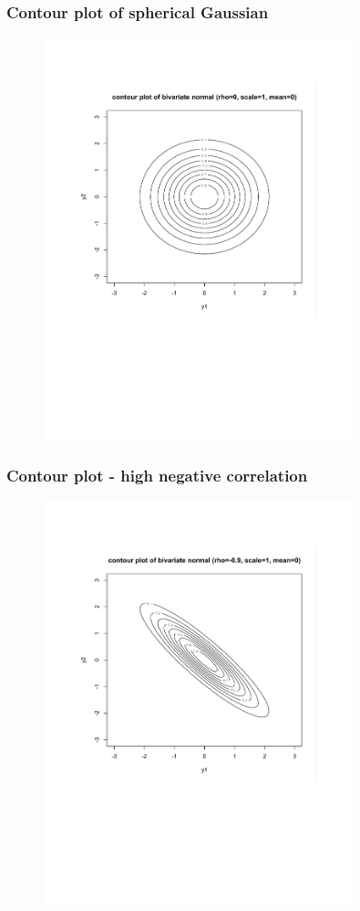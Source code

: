 \documentclass[handout]{beamer}
\begin{document}
\begin{frame}
\frametitle{Contour plot of spherical Gaussian}
\begin{figure}[!t]
\centerline{\includegraphics[width=9cm]{lecture10fig4}}
\end{figure}
\end{frame}

\begin{frame}
\frametitle{Contour plot - high negative correlation}
\begin{figure}[!t]
\centerline{\includegraphics[width=9cm]{lecture10fig5}}
\end{figure}
\end{frame}
\end{document}
